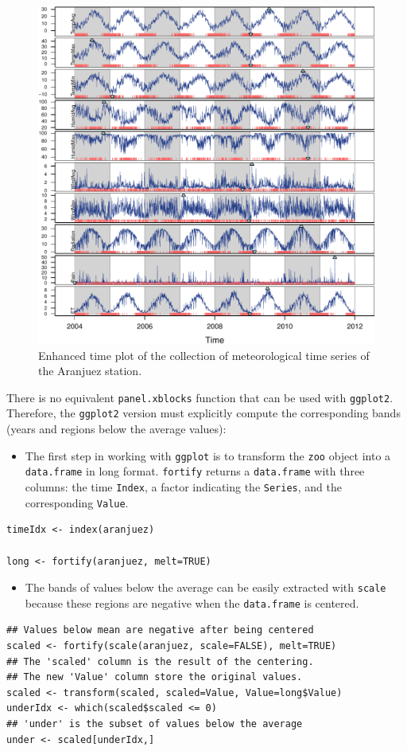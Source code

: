 \begin{figure}[htb]
\centering
\includegraphics[width=.9\linewidth]{figs/aranjuezXblocks.pdf}
\caption{\label{fig:aranjuezEnhanced}Enhanced time plot of the collection of meteorological time series of the Aranjuez station.}
\end{figure}

There is no equivalent \texttt{panel.xblocks} function that can be used with
\texttt{ggplot2}. Therefore, the \texttt{ggplot2} version must explicitly compute
the corresponding bands (years and regions below the average values):

\begin{itemize}
\item The first step in working with \texttt{ggplot} is to transform the \texttt{zoo}
object into a \texttt{data.frame} in long format. \texttt{fortify} returns a
\texttt{data.frame} with three columns: the time \texttt{Index}, a factor
indicating the \texttt{Series}, and the corresponding \texttt{Value}.
\end{itemize}
\lstset{language=R,numbers=none}
\begin{lstlisting}
timeIdx <- index(aranjuez)

long <- fortify(aranjuez, melt=TRUE)
\end{lstlisting}

\begin{itemize}
\item The bands of values below the average can be easily extracted with
\texttt{scale} because these regions are negative when the \texttt{data.frame} is
centered.
\end{itemize}
\lstset{language=R,numbers=none}
\begin{lstlisting}
## Values below mean are negative after being centered
scaled <- fortify(scale(aranjuez, scale=FALSE), melt=TRUE)
## The 'scaled' column is the result of the centering.
## The new 'Value' column store the original values.
scaled <- transform(scaled, scaled=Value, Value=long$Value)
underIdx <- which(scaled$scaled <= 0)
## 'under' is the subset of values below the average
under <- scaled[underIdx,]
\end{lstlisting}

